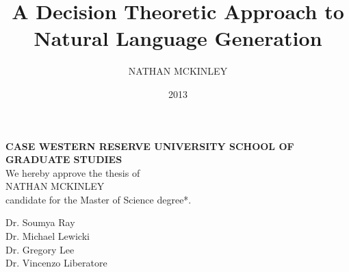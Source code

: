 

\clearpage{}  %



\title{A Decision Theoretic Approach to Natural Language Generation}
\author{NATHAN MCKINLEY}
\date{2013}
\thesis
\makeatletter
\renewcommand\@date{January, 2014}
\makeatother
\maketitle

\clearpage
\begin{center}
{\bf CASE WESTERN RESERVE UNIVERSITY
SCHOOL OF GRADUATE STUDIES}\\

We hereby approve the thesis of\\
NATHAN MCKINLEY\\
candidate for the Master of Science degree*.\\
\end{center}
\noindent
Dr. Soumya Ray\\
Dr. Michael Lewicki\\
Dr. Gregory Lee\\
Dr. Vincenzo Liberatore\\


